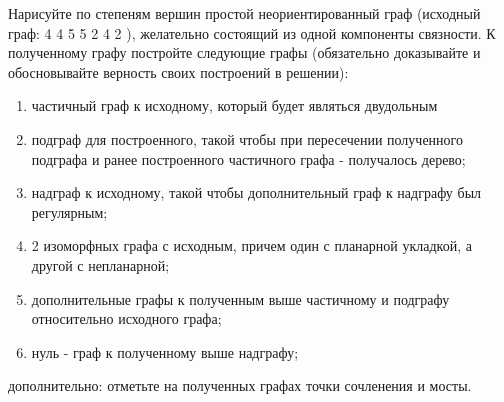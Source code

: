 \question
Нарисуйте по степеням вершин простой неориентированный граф (исходный граф: 4 4 5 5 2 4 2 ), желательно состоящий из одной компоненты связности. 
К полученному графу постройте следующие графы (обязательно доказывайте и  обосновывайте верность своих построений в решении):
\begin{enumerate}
\item   частичный граф к исходному, который будет являться двудольным
\item   подграф для построенного, такой чтобы при пересечении полученного подграфа и ранее построенного частичного графа - получалось дерево;
\item   надграф к исходному, такой чтобы  дополнительный граф к надграфу был  регулярным;
\item   2 изоморфных графа с исходным, причем один с планарной укладкой, а другой с непланарной;
\item   дополнительные графы к полученным выше частичному и подграфу относительно исходного графа;
\item   нуль - граф к полученному выше надграфу;
\end{enumerate}
дополнительно: отметьте на полученных графах точки сочленения и мосты.


